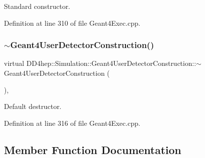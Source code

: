 Standard constructor. 



Definition at line 310 of file Geant4\+Exec.\+cpp.

\hypertarget{class_d_d4hep_1_1_simulation_1_1_geant4_user_detector_construction_a076334cddb22f1ca55027d6bc3a1aac9}{}\label{class_d_d4hep_1_1_simulation_1_1_geant4_user_detector_construction_a076334cddb22f1ca55027d6bc3a1aac9} 
\subsubsection{\texorpdfstring{$\sim$\+Geant4\+User\+Detector\+Construction()}{~Geant4UserDetectorConstruction()}}
{\footnotesize\ttfamily virtual D\+D4hep\+::\+Simulation\+::\+Geant4\+User\+Detector\+Construction\+::$\sim$\+Geant4\+User\+Detector\+Construction (\begin{DoxyParamCaption}{ }\end{DoxyParamCaption})\hspace{0.3cm}{\ttfamily [inline]}, {\ttfamily [virtual]}}



Default destructor. 



Definition at line 316 of file Geant4\+Exec.\+cpp.



\subsection{Member Function Documentation}
\hypertarget{class_d_d4hep_1_1_simulation_1_1_geant4_user_detector_construction_a93280a762663896986d38ece7afd1abc}{}\label{class_d_d4hep_1_1_simulation_1_1_geant4_user_detector_construction_a93280a762663896986d38ece7afd1abc} 
